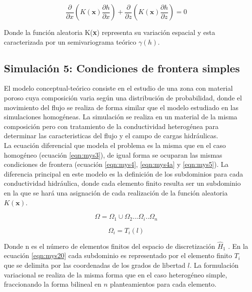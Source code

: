  \begin{equation}
\label{eqn:mys19}                         
\dfrac{\partial}{\partial{x}}(K(\textbf{x})\dfrac{\partial{h}}{\partial{x}})+\dfrac{\partial}{\partial{z}}(K(\textbf{x})\dfrac{\partial{h}}{\partial{z}})=0
\end{equation}

Donde la función aleatoria K(\textbf{x}) representa su variación espacial y esta caracterizada por un semivariograma teórico $\gamma(h)$. 

\subsection{Simulación 5: Condiciones de frontera simples}

El modelo conceptual-teórico consiste en el estudio de una zona con material poroso cuya composición varia según una distribución de probabilidad, donde el movimiento del flujo se realiza de forma similar que el modelo estudiado en las simulaciones homogéneas. La simulación se realiza en un material de la misma composición pero con tratamiento de la conductividad heterogénea para determinar las caracteristicas del flujo y el campo de cargas hidráulicas. 
\\

La ecuación diferencial que modela el problema es la misma que en el caso homogéneo (ecuación \ref{eqn:mys3}), de igual forma se ocuparan las mismas condiciones de frontera (ecuación \ref{eqn:mys4}, \ref{eqn:mys4a} y \ref{eqn:mys5}). La diferencia principal en este modelo es la definición de los subdominios para cada conductividad hidráulica, donde cada elemento finito resulta ser un subdominio en la que se hará una asignación de cada realización de la función aleatoria $K(\textbf{x})$.

 \begin{equation}
\label{eqn:mys20}                         
{\Omega}={\Omega}_{1}{\cup}{\Omega}_{2}...{\Omega}_{i}..{\Omega}_{n} 
\end{equation} 

 \begin{equation}
\label{eqn:mys21}                         
{\Omega}_{i}=T_{i}(l)
\end{equation}

Donde n es el número de elementos finitos del espacio de discretización $\hat{H}_{1}$
. En la ecuación \ref{eqn:mys20} cada subdominio es representado por el elemento finito $T_{i}$ que se delimita por las coordenadas de los grados de libertad $l$. La formulación variacional se realiza de la misma forma que en el caso heterogéneo simple, fraccionando la forma bilineal en $n$ planteamientos para cada elemento.

